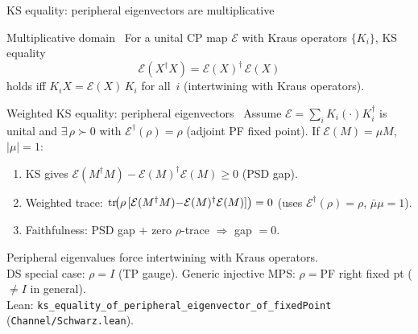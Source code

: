 \documentclass[aspectratio=169,10pt]{beamer}
\newcommand{\cE}{\mathcal{E}}
\begin{document}
\begin{frame}{KS equality: peripheral eigenvectors are multiplicative}
    \vspace{-0.6em}

    \begin{block}{Multiplicative domain~\cite{Wolf2012Quantum}}
        For a unital CP map $\cE$ with Kraus operators $\{K_i\}$, KS equality
        \[
            \cE(X^\dagger X) = \cE(X)^\dagger\,\cE(X)
        \]
        holds iff $K_i X = \cE(X)\, K_i$ for all~$i$ (\alert{intertwining with Kraus operators}).
    \end{block}

    \begin{block}{Weighted KS equality: peripheral eigenvectors~\cite{Cirac2017Annals}}
        Assume $\cE = \sum_i K_i(\cdot)K_i^\dagger$ is \alert{unital} and
        $\exists\,\rho\succ 0$ with $\cE^\dagger(\rho)=\rho$ (adjoint PF fixed point).
        If $\cE(M)=\mu M$, $|\mu|=1$:
        \begin{enumerate}\itemsep0.1em
            \item KS gives $\cE(M^\dagger M) - \cE(M)^\dagger\cE(M) \ge 0$ (PSD gap).
            \item Weighted trace: $\tr\!\bigl(\rho\,[\cE(M^\dagger M){-}\cE(M)^\dagger\cE(M)]\bigr)=0$
                  \;(uses $\cE^\dagger(\rho){=}\rho$, $\bar\mu\mu{=}1$).
            \item Faithfulness: PSD gap $+$ zero $\rho$-trace $\Rightarrow$ gap $= 0$.
        \end{enumerate}
        \textcolor{leangreen}{Peripheral eigenvalues force intertwining with Kraus operators.}\\
        \textcolor{dimwhite}{\footnotesize DS special case: $\rho=I$ (TP gauge). Generic injective MPS: $\rho={}$PF right fixed pt ($\neq I$ in general).%
        \\Lean: \texttt{ks\_equality\_of\_peripheral\_eigenvector\_of\_fixedPoint} (\texttt{Channel/Schwarz.lean}).}
    \end{block}
\end{frame}
\end{document}
